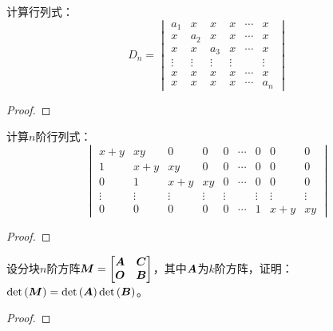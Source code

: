 \begin{problem}
计算行列式：
\begin{equation*}
    D_n=
    \begin{vmatrix}
        a_1    & x      & x      & x      & \cdots & x      \\
        x      & a_2    & x      & x      & \cdots & x      \\
        x      & x      & a_3    & x      & \cdots & x      \\
        \vdots & \vdots & \vdots & \vdots &        & \vdots \\
        x      & x      & x      & x      & \cdots & x      \\
        x      & x      & x      & x      & \cdots & a_n
    \end{vmatrix}
\end{equation*}
\end{problem}
\begin{proof}
\end{proof}

\begin{problem}
计算\(n\)阶行列式：
\begin{equation*}
    \begin{vmatrix}
        x+y    & xy     & 0      & 0      & 0      & \cdots & 0      & 0      & 0      \\
        1      & x+y    & xy     & 0      & 0      & \cdots & 0      & 0      & 0      \\
        0      & 1      & x+y    & xy     & 0      & \cdots & 0      & 0      & 0      \\
        \vdots & \vdots & \vdots & \vdots & \vdots &        & \vdots & \vdots & \vdots \\
        0      & 0      & 0      & 0      & 0      & \cdots & 1      & x+y    & xy
    \end{vmatrix}
\end{equation*}
\end{problem}
\begin{proof}
\end{proof}

\begin{problem}
设分块\(n\)阶方阵\(\boldsymbol{M}=\begin{bmatrix}\boldsymbol{A}&\boldsymbol{C}\\\boldsymbol{O}&\boldsymbol{B}\end{bmatrix}\)，其中\(\boldsymbol{A}\)为\(k\)阶方阵，证明：\(\mathrm{det}\left( \boldsymbol{M} \right)=\mathrm{det}\left( \boldsymbol{A} \right)\mathrm{det}\left( \boldsymbol{B} \right)\)。
\end{problem}
\begin{proof}

\end{proof}


